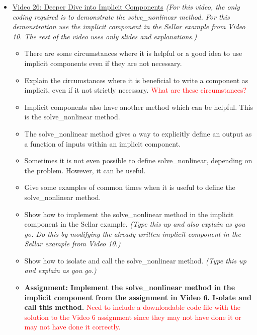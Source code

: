 \documentclass[12pt, letterpaper]{article}
\begin{document}
\begin{itemize}
	\item \underline{Video 26: Deeper Dive into Implicit Components} \textit{(For this video, the only coding required is to demonstrate the solve\_nonlinear method. For this demonstration use the implicit component in the Sellar example from Video 10. The rest of the video uses only slides and explanations.)}
		\begin{itemize}
			\item There are some circumstances where it is helpful or a good idea to use implicit components even if they are not necessary.
			\item Explain the circumstances where it is beneficial to write a component as implicit, even if it not strictly necessary. \textcolor{red}{What are these circumstances?}
			\item Implicit components also have another method which can be helpful. This is the solve\_nonlinear method.
			\item The solve\_nonlinear method gives a way to explicitly define an output as a function of inputs within an implicit component.
			\item Sometimes it is not even possible to define solve\_nonlinear, depending on the problem. However, it can be useful.
			\item Give some examples of common times when it is useful to define the solve\_nonlinear method.
			\item Show how to implement the solve\_nonlinear method in the implicit component in the Sellar example. \textit{(Type this up and also explain as you go. Do this by modifying the already written implicit component in the Sellar example from Video 10.)}
			\item Show how to isolate and call the solve\_nonlinear method. \textit{(Type this up and explain as you go.)}
			\item \textbf{Assignment: Implement the solve\_nonlinear method in the implicit component from the assignment in Video 6. Isolate and call this method.} \textcolor{red}{Need to include a downloadable code file with the solution to the Video 6 assignment since they may not have done it or may not have done it correctly.}
		\end{itemize}


\end{itemize}
\end{document}
